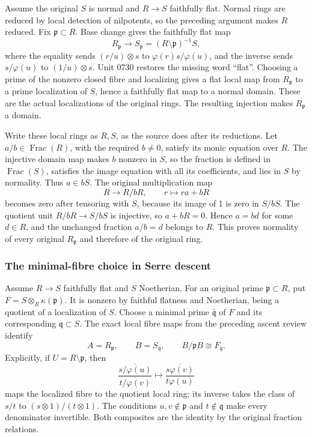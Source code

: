 Assume the original \(S\) is normal and \(R\to S\) faithfully flat. Normal rings are reduced by local detection of nilpotents, so the preceding argument makes \(R\) reduced. Fix \(\mathfrak p\subset R\). Base change gives the faithfully flat map \[
 R_{\mathfrak p}\longrightarrow S_{\mathfrak p}
 =(R\setminus\mathfrak p)^{-1}S,
\] where the equality sends \((r/u)\otimes s\) to \(\varphi(r)s/\varphi(u)\), and the inverse sends \(s/\varphi(u)\) to \((1/u)\otimes s\). Unit 0730 restores the missing word ``flat''. Choosing a prime of the nonzero closed fibre and localizing gives a flat local map from \(R_{\mathfrak p}\) to a prime localization of \(S\), hence a faithfully flat map to a normal domain. These are the actual localizations of the original rings. The resulting injection makes \(R_{\mathfrak p}\) a domain.

Write these local rings as \(R,S\), as the source does after its reductions. Let \(a/b\in\operatorname{Frac}(R)\), with the required \(b\ne0\), satisfy its monic equation over \(R\). The injective domain map makes \(b\) nonzero in \(S\), so the fraction is defined in \(\operatorname{Frac}(S)\), satisfies the image equation with all its coefficients, and lies in \(S\) by normality. Thus \(a\in bS\). The original multiplication map \[
 R\longrightarrow R/bR,\qquad r\longmapsto ra+bR
\] becomes zero after tensoring with \(S\), because its image of 1 is zero in \(S/bS\). The quotient unit \(R/bR\to S/bS\) is injective, so \(a+bR=0\). Hence \(a=bd\) for some \(d\in R\), and the unchanged fraction \(a/b=d\) belongs to \(R\). This proves normality of every original \(R_{\mathfrak p}\) and therefore of the original ring.

\subsubsection{The minimal-fibre choice in Serre descent}\label{algebra-proof-069-the-minimal-fibre-choice-in-serre-descent}

Assume \(R\to S\) faithfully flat and \(S\) Noetherian. For an original prime \(\mathfrak p\subset R\), put \(F=S\otimes_R\kappa(\mathfrak p)\). It is nonzero by faithful flatness and Noetherian, being a quotient of a localization of \(S\). Choose a minimal prime \(\bar{\mathfrak q}\) of \(F\) and its corresponding \(\mathfrak q\subset S\). The exact local fibre maps from the preceding ascent review identify \[
 A=R_{\mathfrak p},\qquad B=S_{\mathfrak q},\qquad
 B/\mathfrak pB\cong F_{\bar{\mathfrak q}}.
\] Explicitly, if \(U=R\setminus\mathfrak p\), then \[
 \frac{\overline{s/\varphi(u)}}{\overline{t/\varphi(v)}}
 \longmapsto\overline{\frac{s\varphi(v)}{t\varphi(u)}}
\] maps the localized fibre to the quotient local ring; its inverse takes the class of \(s/t\) to \((s\otimes1)/(t\otimes1)\). The conditions \(u,v\notin\mathfrak p\) and \(t\notin\mathfrak q\) make every denominator invertible. Both composites are the identity by the original fraction relations.

